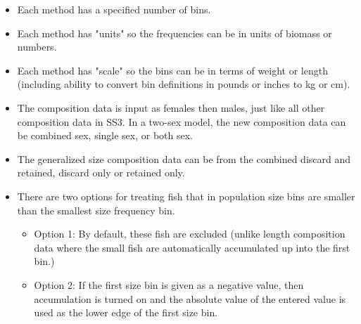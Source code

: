 \begin{itemize}
	\item Each method has a specified number of bins.
	\item Each method has "units" so the frequencies can be in units of biomass or numbers.
	\item Each method has "scale" so the bins can be in terms of weight or length (including ability to convert bin definitions in pounds or inches to kg or cm). 
	\item The composition data is input as females then males, just like all other composition data in SS3. In a two-sex model, the new composition data can be combined sex, single sex, or both sex.
	\item The generalized size composition data can be from the combined discard and retained, discard only or retained only.
	\item There are two options for treating fish that in population size bins are smaller than the smallest size frequency bin.
	\begin{itemize}
		\item Option 1: By default, these fish are excluded (unlike length composition data where the small fish are automatically accumulated up into the first bin.)
		\item Option 2: If the first size bin is given as a negative value, then accumulation is turned on and the absolute value of the entered value is used as the lower edge of the first size bin.
	\end{itemize}
\end{itemize}

